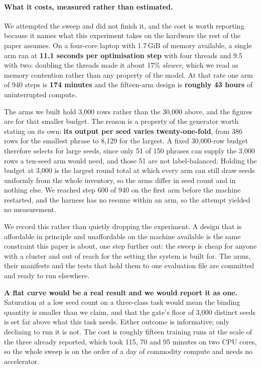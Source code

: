 \paragraph{What it costs, measured rather than estimated.} We attempted the
sweep and did not finish it, and the cost is worth reporting because it names
what this experiment takes on the hardware the rest of the paper assumes. On a
four-core laptop with 1.7\,GiB of memory available, a single arm ran at
\textbf{11.1 seconds per optimisation step} with four threads and 9.5 with two:
doubling the threads made it about 17\% \emph{slower}, which we read as memory
contention rather than any property of the model. At that rate one arm of 940
steps is \textbf{174 minutes} and the fifteen-arm design is \textbf{roughly 43
hours} of uninterrupted compute.

The arms we built hold 3{,}000 rows rather than the 30{,}000 above, and the
figures are for that smaller budget. The reason is a property of the generator
worth stating on its own: \textbf{its output per seed varies twenty-one-fold},
from 386 rows for the smallest phrase to 8{,}129 for the largest. A fixed
30{,}000-row budget therefore selects for large seeds, since only 51 of 150
phrases can supply the 3{,}000 rows a ten-seed arm would need, and those 51 are
not label-balanced. Holding the budget at 3{,}000 is the largest round total at
which every arm can still draw seeds uniformly from the whole inventory, so the
arms differ in seed count and in nothing else. We reached step 600 of 940 on the first arm
before the machine restarted, and the harness has no resume within an arm, so
the attempt yielded no measurement.

We record this rather than quietly dropping the experiment. A design that is
affordable in principle and unaffordable on the machine available is the same
constraint this paper is about, one step further out: the sweep is cheap for
anyone with a cluster and out of reach for the setting the system is built for.
The arms, their manifests and the tests that hold them to one evaluation file
are committed and ready to run elsewhere.

\textbf{A flat curve would be a real result and we would report it as one.}
Saturation at a low seed count on a three-class task would mean the binding
quantity is smaller than we claim, and that the gate's floor of 3{,}000 distinct
seeds is set far above what this task needs. Either outcome is informative; only
declining to run it is not. The cost is roughly fifteen training runs at the
scale of the three already reported, which took 115, 70 and 95 minutes on two
CPU cores, so the whole sweep is on the order of a day of commodity compute and
needs no accelerator.

